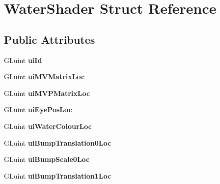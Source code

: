\hypertarget{struct_water_shader}{\section{Water\+Shader Struct Reference}
\label{struct_water_shader}
}
\subsection*{Public Attributes}
\begin{DoxyCompactItemize}
\item 
\hypertarget{struct_water_shader_a30228ed3899b19a9110d6612e5e13d45}{G\+Luint {\bfseries ui\+Id}}\label{struct_water_shader_a30228ed3899b19a9110d6612e5e13d45}

\item 
\hypertarget{struct_water_shader_ab0e76c039bb1f64e0b68a2a23b16933a}{G\+Luint {\bfseries ui\+M\+V\+Matrix\+Loc}}\label{struct_water_shader_ab0e76c039bb1f64e0b68a2a23b16933a}

\item 
\hypertarget{struct_water_shader_afe3438bca0a9b1d6b3cea152ece25c88}{G\+Luint {\bfseries ui\+M\+V\+P\+Matrix\+Loc}}\label{struct_water_shader_afe3438bca0a9b1d6b3cea152ece25c88}

\item 
\hypertarget{struct_water_shader_ae6875efe93bac5f6939764f1f2e18fc7}{G\+Luint {\bfseries ui\+Eye\+Pos\+Loc}}\label{struct_water_shader_ae6875efe93bac5f6939764f1f2e18fc7}

\item 
\hypertarget{struct_water_shader_aae2d7f6bd59e1141c02742893cc54020}{G\+Luint {\bfseries ui\+Water\+Colour\+Loc}}\label{struct_water_shader_aae2d7f6bd59e1141c02742893cc54020}

\item 
\hypertarget{struct_water_shader_a6e5312d1a958de5ba83e071cc7245a24}{G\+Luint {\bfseries ui\+Bump\+Translation0\+Loc}}\label{struct_water_shader_a6e5312d1a958de5ba83e071cc7245a24}

\item 
\hypertarget{struct_water_shader_a9d4b090ae8ac72f93aff4e586ef6b853}{G\+Luint {\bfseries ui\+Bump\+Scale0\+Loc}}\label{struct_water_shader_a9d4b090ae8ac72f93aff4e586ef6b853}

\item 
\hypertarget{struct_water_shader_ae5c38765c6e035292f0254e4263e55ae}{G\+Luint {\bfseries ui\+Bump\+Translation1\+Loc}}\label{struct_water_shader_ae5c38765c6e035292f0254e4263e55ae}


\end{DoxyCompactItemize}
